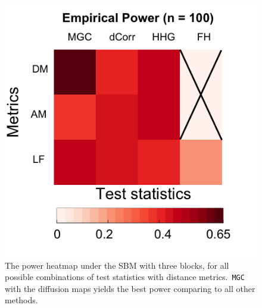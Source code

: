 \documentclass[11pt]{article}
\theoremstyle{definition}
\begin{document}
\begin{figure}
	\centering
	\includegraphics[width=0.4\paperwidth, height=0.4\paperwidth]{ThreeSBM_results_short.png}
	\caption{The power heatmap under the SBM with three blocks, for all possible combinations of test statistics with distance metrics.~\texttt{MGC} with the diffusion maps yields the best power comparing to all other methods. }
	\label{fig:threeSBM}
\end{figure}
\end{document}
